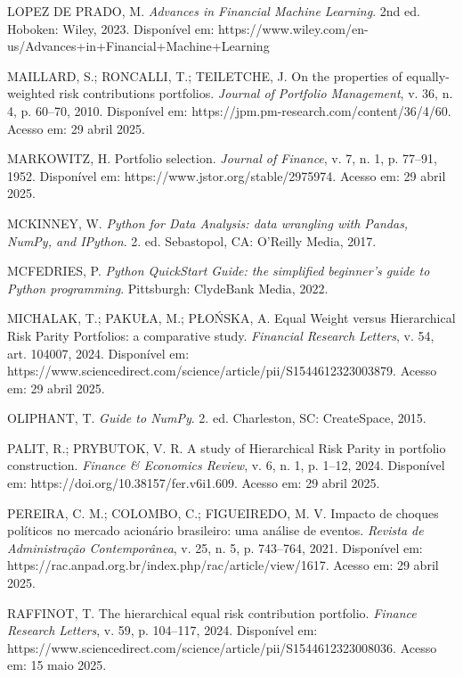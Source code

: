 \begin{thebibliography}{99}
LOPEZ DE PRADO, M. \textit{Advances in Financial Machine Learning}. 2nd ed. Hoboken: Wiley, 2023. Disponível em: https://www.wiley.com/en-us/Advances+in+Financial+Machine+Learning%

MAILLARD, S.; RONCALLI, T.; TEILETCHE, J. On the properties of equally-weighted risk contributions portfolios. \textit{Journal of Portfolio Management}, v. 36, n. 4, p. 60--70, 2010. Disponível em: https://jpm.pm-research.com/content/36/4/60. Acesso em: 29 abril 2025.

MARKOWITZ, H. Portfolio selection. \textit{Journal of Finance}, v. 7, n. 1, p. 77--91, 1952. Disponível em: https://www.jstor.org/stable/2975974. Acesso em: 29 abril 2025.

MCKINNEY, W. \textit{Python for Data Analysis: data wrangling with Pandas, NumPy, and IPython}. 2. ed. Sebastopol, CA: O'Reilly Media, 2017.

MCFEDRIES, P. \textit{Python QuickStart Guide: the simplified beginner's guide to Python programming}. Pittsburgh: ClydeBank Media, 2022.

MICHALAK, T.; PAKUŁA, M.; PŁOŃSKA, A. Equal Weight versus Hierarchical Risk Parity Portfolios: a comparative study. \textit{Financial Research Letters}, v. 54, art. 104007, 2024. Disponível em: https://www.sciencedirect.com/science/article/pii/S1544612323003879. Acesso em: 29 abril 2025.

OLIPHANT, T. \textit{Guide to NumPy}. 2. ed. Charleston, SC: CreateSpace, 2015.

PALIT, R.; PRYBUTOK, V. R. A study of Hierarchical Risk Parity in portfolio construction. \textit{Finance \& Economics Review}, v. 6, n. 1, p. 1--12, 2024. Disponível em: https://doi.org/10.38157/fer.v6i1.609. Acesso em: 29 abril 2025.

PEREIRA, C. M.; COLOMBO, C.; FIGUEIREDO, M. V. Impacto de choques políticos no mercado acionário brasileiro: uma análise de eventos. \textit{Revista de Administração Contemporânea}, v. 25, n. 5, p. 743--764, 2021. Disponível em: https://rac.anpad.org.br/index.php/rac/article/view/1617. Acesso em: 29 abril 2025.

RAFFINOT, T. The hierarchical equal risk contribution portfolio. \textit{Finance Research Letters}, v. 59, p. 104--117, 2024. Disponível em: https://www.sciencedirect.com/science/article/pii/S1544612323008036. Acesso em: 15 maio 2025.


\end{thebibliography}
